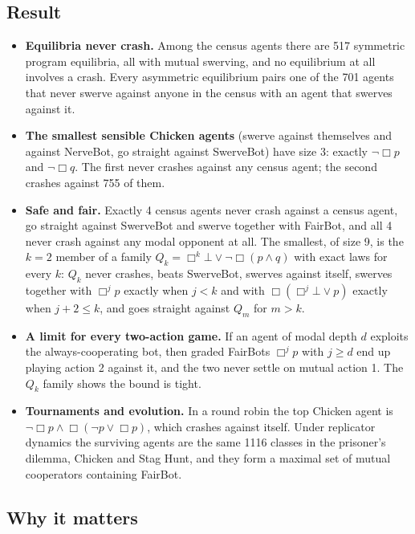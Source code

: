 \documentclass{article}
\begin{document}
\subsection*{Result}

\begin{itemize}
\item \textbf{Equilibria never crash.} Among the census agents there are 517 symmetric program equilibria, all with mutual swerving, and no equilibrium at all involves a crash. Every asymmetric equilibrium pairs one of the 701 agents that never swerve against anyone in the census with an agent that swerves against it.
\item \textbf{The smallest sensible Chicken agents} (swerve against themselves and against NerveBot, go straight against SwerveBot) have size 3: exactly $\neg\Box p$ and $\neg\Box q$. The first never crashes against any census agent; the second crashes against 755 of them.
\item \textbf{Safe and fair.} Exactly 4 census agents never crash against a census agent, go straight against SwerveBot and swerve together with FairBot, and all 4 never crash against any modal opponent at all. The smallest, of size 9, is the $k=2$ member of a family $Q_k = \Box^k\bot \vee \neg\Box(p \wedge q)$ with exact laws for every $k$: $Q_k$ never crashes, beats SwerveBot, swerves against itself, swerves together with $\Box^j p$ exactly when $j < k$ and with $\Box(\Box^j\bot \vee p)$ exactly when $j + 2 \le k$, and goes straight against $Q_m$ for $m > k$.
\item \textbf{A limit for every two-action game.} If an agent of modal depth $d$ exploits the always-cooperating bot, then graded FairBots $\Box^j p$ with $j \ge d$ end up playing action 2 against it, and the two never settle on mutual action 1. The $Q_k$ family shows the bound is tight.
\item \textbf{Tournaments and evolution.} In a round robin the top Chicken agent is $\neg\Box p \wedge \Box(\neg p \vee \Box p)$, which crashes against itself. Under replicator dynamics the surviving agents are the same 1116 classes in the prisoner's dilemma, Chicken and Stag Hunt, and they form a maximal set of mutual cooperators containing FairBot.
\end{itemize}

\subsection*{Why it matters}
\end{document}
